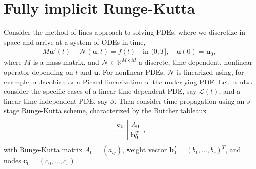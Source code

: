 \documentclass[a4paper,10pt]{article}
\begin{document}
\allowdisplaybreaks


\section{Fully implicit Runge-Kutta}

Consider the method-of-lines approach to solving PDEs, where we discretize in space and arrive
at a system of ODEs in time,
%
\begin{align}\label{eq:problem}
	M\mathbf{u}'(t) + \mathcal{N}(\mathbf{u},t) = f(t) \quad\text{in }(0,T], \quad \mathbf{u}(0) = \mathbf{u}_0,
\end{align}
where $M$ is a mass matrix, and $\mathcal{N}\in\mathbb{R}^{M\times M}$ a discrete, time-dependent, nonlinear
operator depending on $t$ and $\mathbf{u}$. For nonlinear PDEs, $\mathcal{N}$ is linearized using, for example,
a Jacobian or a Picard linearization of the underlying PDE. Let us also consider the specific cases
of a linear time-dependent PDE, say $\mathcal{L}(t)$, and a linear time-independent PDE, say $\mathcal{S}$. 
Then consider time propagation using an $s$-stage Runge-Kutta scheme, characterized by the Butcher
tableaux 
%
\begin{align*}
	\renewcommand\arraystretch{1.2}
	\begin{array}
	{c|c}
	\mathbf{c}_0 & A_0\\
	\hline
	& \mathbf{b}_0^T
	\end{array},
\end{align*}
%
with Runge-Kutta matrix $A_0 = (a_{ij})$, weight vector $\mathbf{b}_0^T = (b_1, \ldots, b_s)^T$, and 
nodes $\mathbf{c}_0 = (c_0, \ldots, c_s)$.
\end{document}
